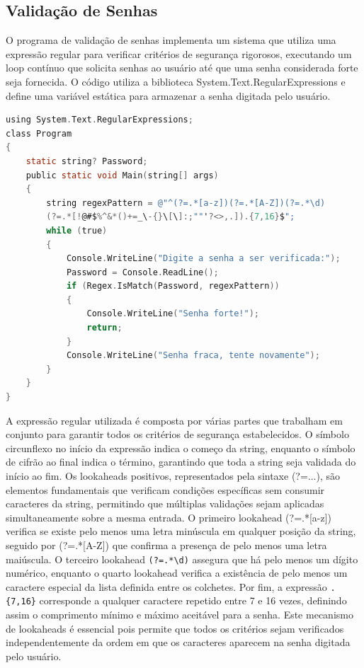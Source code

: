 \documentclass[
	12pt,				%
	oneside,			%
	a4paper,			%
	english,			%
	brazil,				%
	]{abntex2}
\begin{document}
{\subsection{Validação de Senhas}

O programa de validação de senhas implementa um sistema que utiliza uma expressão regular para verificar critérios de segurança rigorosos, executando um loop contínuo que solicita senhas ao usuário até que uma senha considerada forte seja fornecida. O código utiliza a biblioteca System.Text.RegularExpressions e define uma variável estática para armazenar a senha digitada pelo usuário.

\begin{lstlisting}[language=C]
using System.Text.RegularExpressions;
class Program
{
    static string? Password;
    public static void Main(string[] args)
    {
        string regexPattern = @"^(?=.*[a-z])(?=.*[A-Z])(?=.*\d)
        (?=.*[!@#$%^&*()+=_\-{}\[\]:;""'?<>,.]).{7,16}$";
        while (true)
        {
            Console.WriteLine("Digite a senha a ser verificada:");
            Password = Console.ReadLine();
            if (Regex.IsMatch(Password, regexPattern))
            {
                Console.WriteLine("Senha forte!");
                return;
            }
            Console.WriteLine("Senha fraca, tente novamente");
        }
    }
}
\end{lstlisting}

A expressão regular utilizada é composta por várias partes que trabalham em conjunto para garantir todos os critérios de segurança estabelecidos. O símbolo circunflexo no início da expressão indica o começo da string, enquanto o símbolo de cifrão ao final indica o término, garantindo que toda a string seja validada do início ao fim. Os lookaheads positivos, representados pela sintaxe (?=...), são elementos fundamentais que verificam condições específicas sem consumir caracteres da string, permitindo que múltiplas validações sejam aplicadas simultaneamente sobre a mesma entrada. O primeiro lookahead (?=.*[a-z]) verifica se existe pelo menos uma letra minúscula em qualquer posição da string, seguido por (?=.*[A-Z]) que confirma a presença de pelo menos uma letra maiúscula. O terceiro lookahead \verb|(?=.*\d)| assegura que há pelo menos um dígito numérico, enquanto o quarto lookahead verifica a existência de pelo menos um caractere especial da lista definida entre os colchetes. Por fim, a expressão \verb|.{7,16}| corresponde a qualquer caractere repetido entre 7 e 16 vezes, definindo assim o comprimento mínimo e máximo aceitável para a senha. Este mecanismo de lookaheads é essencial pois permite que todos os critérios sejam verificados independentemente da ordem em que os caracteres aparecem na senha digitada pelo usuário.

}
\end{document}
